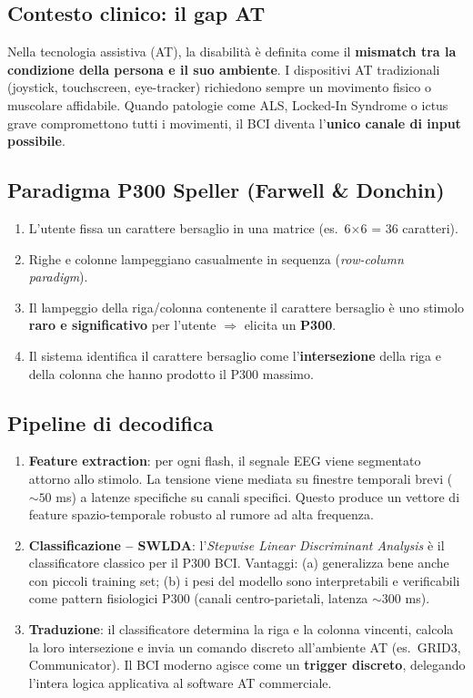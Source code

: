 \subsection{Contesto clinico: il gap AT}

Nella tecnologia assistiva (AT), la disabilità è definita come il \textbf{mismatch tra la condizione della persona e il suo ambiente}. I dispositivi AT tradizionali (joystick, touchscreen, eye-tracker) richiedono sempre un movimento fisico o muscolare affidabile. Quando patologie come ALS, Locked-In Syndrome o ictus grave compromettono tutti i movimenti, il BCI diventa l'\textbf{unico canale di input possibile}.

\subsection{Paradigma P300 Speller (Farwell \& Donchin)}

\begin{enumerate}
    \item L'utente fissa un carattere bersaglio in una matrice (es.\ 6$\times$6 = 36 caratteri).
    \item Righe e colonne lampeggiano casualmente in sequenza (\textit{row-column paradigm}).
    \item Il lampeggio della riga/colonna contenente il carattere bersaglio è uno stimolo \textbf{raro e significativo} per l'utente $\Rightarrow$ elicita un \textbf{P300}.
    \item Il sistema identifica il carattere bersaglio come l'\textbf{intersezione} della riga e della colonna che hanno prodotto il P300 massimo.
\end{enumerate}

\subsection{Pipeline di decodifica}

\begin{enumerate}
    \item \textbf{Feature extraction}: per ogni flash, il segnale EEG viene segmentato attorno allo stimolo. La tensione viene mediata su finestre temporali brevi ($\sim 50$ ms) a latenze specifiche su canali specifici. Questo produce un vettore di feature spazio-temporale robusto al rumore ad alta frequenza.
    \item \textbf{Classificazione -- SWLDA}: l'\textit{Stepwise Linear Discriminant Analysis} è il classificatore classico per il P300 BCI. Vantaggi: (a) generalizza bene anche con piccoli training set; (b) i pesi del modello sono interpretabili e verificabili come pattern fisiologici P300 (canali centro-parietali, latenza $\sim 300$ ms).
    \item \textbf{Traduzione}: il classificatore determina la riga e la colonna vincenti, calcola la loro intersezione e invia un comando discreto all'ambiente AT (es.\ GRID3, Communicator). Il BCI moderno agisce come un \textbf{trigger discreto}, delegando l'intera logica applicativa al software AT commerciale.
\end{enumerate}

